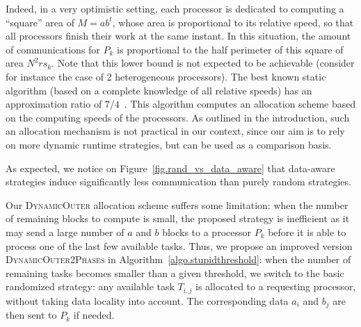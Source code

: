 \documentclass[a4paper,10pt]{article}
\newcommand{\stupid}{\textsc{Dynamic\-Outer}\xspace}
\newcommand{\stupidthreshold}{\textsc{Dynamic\-Outer\-2Phases}\xspace}
\begin{document}
Indeed, in a very optimistic setting, each
processor is dedicated to computing a ``square'' area of $M= a b^t$,
whose area is proportional to its relative speed, so that all processors finish their work at the same instant. In this situation,
the amount of communications for $P_k$ is proportional to the half perimeter of this
square of area $N^2\mathit{rs}_k$. Note that this lower bound is not
expected to be achievable (consider for instance the case of 2 heterogeneous processors). The best known static algorithm (based on a complete knowledge of all relative speeds) has an
approximation ratio of $7/4$~\cite{algorithmica02}. This algorithm
computes an allocation scheme based on the computing speeds of the
processors. As outlined in
the introduction, such an allocation mechanism is not practical in our
context, since our aim is to rely on more dynamic runtime strategies, but can be used as a  comparison basis.



As expected, we notice on Figure~\ref{fig.rand_vs_data_aware} that
data-aware strategies induce significantly less communication than
purely random strategies.

Our \stupid allocation scheme suffers some limitation: when the number
of remaining blocks to compute is small, the proposed strategy is
inefficient as it may send a large number of $a$ and $b$ blocks to a
processor $P_k$ before it is able to process one of the last few
available tasks. Thus, we propose an improved version
\stupidthreshold in Algorithm~\ref{algo.stupidthreshold}: when the
number of remaining tasks becomes smaller than a given threshold, we switch to
the basic randomized strategy: any available task $T_{i,j}$ is allocated to a
requesting processor, without taking data locality into account. The
corresponding data $a_i$ and $b_j$  are then sent to $P_k$ if needed.

\begin{algorithm}[htbp]
  \DontPrintSemicolon
  \caption{\stupidthreshold strategy.}
  \label{algo.stupidthreshold}
\end{algorithm}
\end{document}
